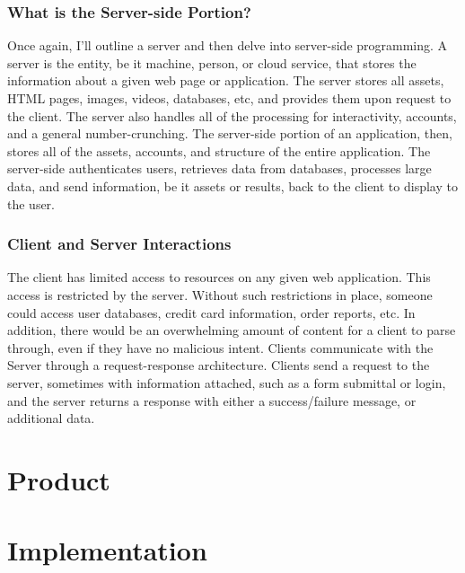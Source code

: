 \documentclass[11pt]{article}
\begin{document}
\subsubsection{What is the Server-side Portion?}
Once again, I'll outline a server and then delve into server-side programming. A server is the entity, be it machine, person, or cloud service, that stores the information about a given web page or application. The server stores all assets, HTML pages, images, videos, databases, etc, and provides them upon request to the client. The server also handles all of the processing for interactivity, accounts, and a general number-crunching.
The server-side portion of an application, then, stores all of the assets, accounts, and structure of the entire application. The server-side authenticates users, retrieves data from databases, processes large data, and send information, be it assets or results, back to the client to display to the user.

\subsubsection{Client and Server Interactions}
The client has limited access to resources on any given web application. This access is restricted by the server. Without such restrictions in place, someone could access user databases, credit card information, order reports, etc. In addition, there would be an overwhelming amount of content for a client to parse through, even if they have no malicious intent.
Clients communicate with the Server through a request-response architecture. Clients send a request to the server, sometimes with information attached, such as a form submittal or login, and the server returns a response with either a success/failure message, or additional data.

\section{Product}


\section{Implementation}
\end{document}
